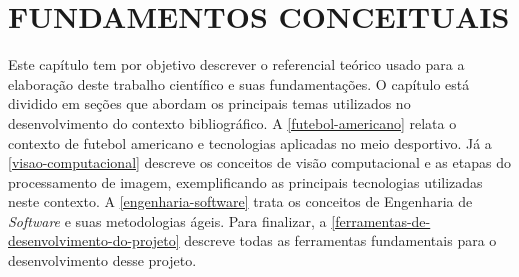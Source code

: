 \chapter{\textbf{FUNDAMENTOS CONCEITUAIS}}
\label{cap-fundamentos-conceituais}

Este capítulo tem por objetivo descrever o referencial teórico usado para a elaboração deste trabalho científico e suas fundamentações. O capítulo está dividido em seções que abordam os principais temas utilizados no desenvolvimento do contexto bibliográfico. A \autoref{futebol-americano} relata o contexto de futebol americano e tecnologias aplicadas no meio desportivo. Já a \autoref{visao-computacional} descreve os conceitos de visão computacional e as etapas do processamento de imagem, exemplificando as principais tecnologias utilizadas neste contexto. A \autoref{engenharia-software} trata os conceitos de Engenharia de \textit{Software} e suas metodologias ágeis. Para finalizar, a \autoref{ferramentas-de-desenvolvimento-do-projeto} descreve todas as ferramentas fundamentais para o desenvolvimento desse projeto.







